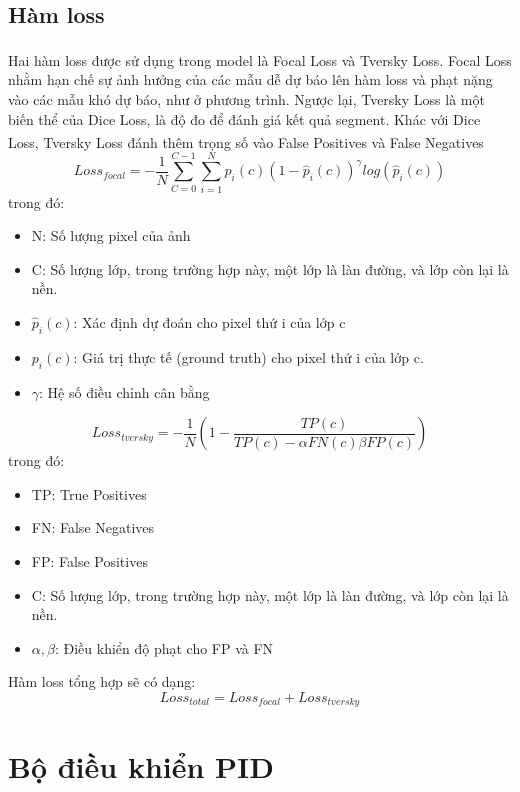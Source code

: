 \subsection{Hàm loss}
\tab Hai hàm loss được sử dụng trong model là Focal Loss\textsuperscript{\cite {focalloss}} và Tversky Loss\textsuperscript{\cite{tverskyloss}}. Focal Loss nhằm hạn chế sự ảnh hưởng của các mẫu dễ dự báo lên hàm loss và phạt nặng vào các mẫu khó dự báo, như ở phương trình. Ngược lại, Tversky Loss là một biến thể của Dice Loss, là độ đo để đánh giá kết quả segment. Khác với Dice Loss\textsuperscript{\cite{diceloss}}, Tversky Loss đánh thêm trọng số vào False Positives và False Negatives
\begin{equation}
Loss_{focal} = - \frac{1}{N}\sum_{C = 0}^{C - 1}\sum_{i = 1}^{N}p_i(c)(1 - \hat{p}_i(c))^{\gamma}log(\hat{p}_i(c))
\end{equation}
trong đó:
\begin{itemize}
    \item N: Số lượng pixel của ảnh
    \item C: Số lượng lớp, trong trường hợp này, một lớp là làn đường, và lớp còn lại là nền.
    \item \(\hat{p}_i(c)\): Xác định dự đoán cho pixel thứ 
i của lớp c
    \item \(p_i(c)\): Giá trị thực tế (ground truth) cho pixel thứ i của lớp c.
    \item \(\gamma\): Hệ số điều chỉnh cân bằng
\end{itemize}
\begin{equation}
Loss_{tversky} = - \frac{1}{N}(1 - \frac{TP(c)}{TP(c) - \alpha FN(c) \beta FP(c)})
\end{equation}
trong đó:
\begin{itemize}
    \item TP: True Positives
    \item FN: False Negatives
    \item FP: False Positives
    \item C: Số lượng lớp, trong trường hợp này, một lớp là làn đường, và lớp còn lại là nền.
    \item \(\alpha, \beta\): Điều khiển độ phạt cho FP và FN
\end{itemize}
Hàm loss tổng hợp sẽ có dạng:
\begin{equation}
Loss_{total} = Loss_{focal} + Loss_{tversky}
\end{equation}
\section{Bộ điều khiển PID}
